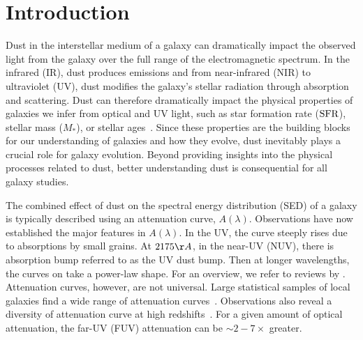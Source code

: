 \section{Introduction} \label{sec:intro} 
Dust in the interstellar medium of a galaxy can dramatically impact the
observed light from the galaxy over the full range of the electromagnetic spectrum. 
In the infrared (IR), dust produces emissions and from near-infrared (NIR) to
ultraviolet (UV), dust modifies the galaxy's stellar radiation through
absorption and scattering. Dust can therefore dramatically impact the physical
properties of galaxies we infer from optical and UV light, such as star
formation rate (${\rm SFR}$), stellar mass ($M_*$), or stellar ages~\citep[see
reviews by][]{walcher2011, conroy2013}. Since these properties are the
building blocks for our understanding of galaxies and how they evolve, dust
inevitably plays a crucial role for galaxy evolution. Beyond providing insights
into the physical processes related to dust, better understanding dust is
consequential for all galaxy studies.

The combined effect of dust on the spectral energy distribution (SED) of a
galaxy is typically described using an attenuation curve, $A(\lambda)$.
Observations have now established the major features in $A(\lambda)$. In the UV, the 
curve steeply rises due to absorptions by small grains. At $2175\AA$, in the 
near-UV (NUV), there is absorption bump referred to as the UV dust bump. Then 
at longer wavelengths, the curves on take a power-law shape. For an overview, we 
refer to reviews by \cite{calzetti2001, draine2003, galliano2018}. Attenuation
curves, however, are not universal. Large statistical samples of local galaxies
find a wide range of attenuation curves~\citep{wild2011, battisti2017,
salim2018, salim2020}. Observations also reveal a diversity of attenuation
curve at high redshifts~\citep[\eg][]{reddy2015, salmon2016}. For a given
amount of optical attenuation, the far-UV (FUV) attenuation can be $\sim
2-7\times$ greater. 

